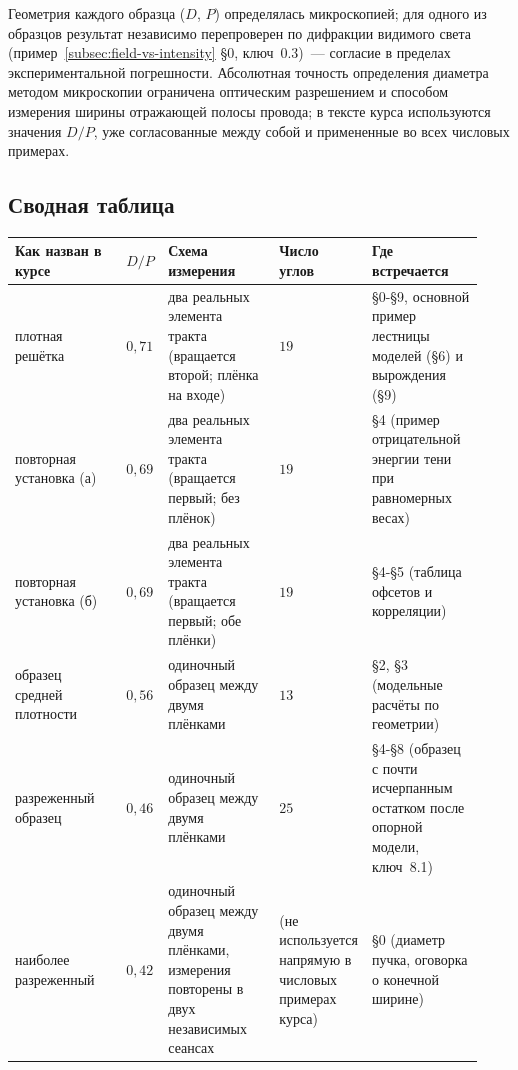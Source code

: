 Геометрия каждого образца ($D$, $P$) определялась микроскопией; для одного из образцов результат
независимо перепроверен по дифракции видимого света (пример~\ref{subsec:field-vs-intensity} §0,
ключ~0.3)~--- согласие в пределах экспериментальной погрешности. Абсолютная точность определения
диаметра методом микроскопии ограничена оптическим разрешением и способом измерения ширины
отражающей полосы провода; в тексте курса используются значения $D/P$, уже согласованные между
собой и примененные во всех числовых примерах.

\subsection*{Сводная таблица}

\begin{center}
\footnotesize
\setlength{\tabcolsep}{5pt}
\begin{tabular}{@{}p{0.24\linewidth}p{0.09\linewidth}p{0.24\linewidth}p{0.12\linewidth}p{0.24\linewidth}@{}}
\toprule
\textbf{Как назван в курсе} & \textbf{$D/P$} & \textbf{Схема измерения} & \textbf{Число углов} &
\textbf{Где встречается} \\
\midrule
плотная решётка & $0{,}71$ & два реальных элемента тракта (вращается второй; плёнка на входе) &
$19$ & §0-§9, основной пример лестницы моделей (§6) и вырождения (§9) \\
\addlinespace[3pt]
повторная установка (а) & $0{,}69$ & два реальных элемента тракта (вращается первый; без плёнок) &
$19$ & §4 (пример отрицательной энергии тени при равномерных весах) \\
\addlinespace[3pt]
повторная установка (б) & $0{,}69$ & два реальных элемента тракта (вращается первый; обе плёнки) &
$19$ & §4-§5 (таблица офсетов и корреляции) \\
\addlinespace[3pt]
образец средней плотности & $0{,}56$ & одиночный образец между двумя плёнками & $13$ & §2, §3
(модельные расчёты по геометрии) \\
\addlinespace[3pt]
разреженный образец & $0{,}46$ & одиночный образец между двумя плёнками & $25$ & §4-§8 (образец с
почти исчерпанным остатком после опорной модели, ключ~8.1) \\
\addlinespace[3pt]
наиболее разреженный & $0{,}42$ & одиночный образец между двумя плёнками, измерения повторены в
двух независимых сеансах & (не используется напрямую в числовых примерах курса) & §0 (диаметр
пучка, оговорка о конечной ширине) \\
\bottomrule
\end{tabular}
\end{center}

